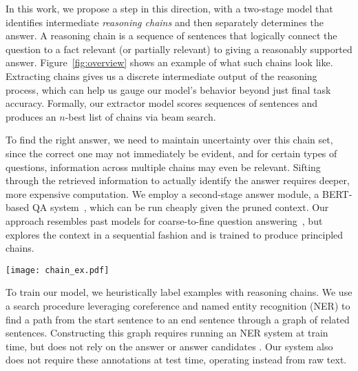 \documentclass[11pt,a4paper]{article}
\begin{document}
In this work, we propose a step in this direction, with a two-stage model that identifies intermediate \emph{reasoning chains} and then separately determines the answer. A reasoning chain is a sequence of sentences that logically connect the question to a fact relevant (or partially relevant) to giving a reasonably supported answer. Figure~\ref{fig:overview} shows an example of what such chains look like. Extracting chains gives us a discrete intermediate output of the reasoning process, which can help us gauge our model's behavior beyond just final task accuracy. Formally, our extractor model scores sequences of sentences and produces an $n$-best list of chains via beam search.

To find the right answer, we need to maintain uncertainty over this chain set, since the correct one may not immediately be evident, and for certain types of questions, information across multiple chains may even be relevant. Sifting through the retrieved information to actually identify the answer requires deeper, more expensive computation. We employ a second-stage answer module, a BERT-based QA system~\citep{devlin2018bert}, which can be run cheaply given the pruned context. Our approach resembles past models for coarse-to-fine question answering~\citep{choi2017coarse, min2018efficient, wang2019evidence}, but explores the context in a sequential fashion and is trained to produce principled chains.



\begin{figure*}[t]
\centering
\texttt{[image: chain\_ex.pdf]}
\caption{A multi-hop example chosen from the HotpotQA development set. Several documents are given as context to answer a question. We show two possible ``reasoning chains'' that leverage connections (shared entities or coreference relations) between sentences to arrive at the answer. The first chain is most appropriate, while the second requires a less well-supported inferential leap.}
\vspace{-0.5cm}
    \label{fig:overview}
\end{figure*}

To train our model, we heuristically label examples with reasoning chains. We use a search procedure leveraging coreference and named entity recognition (NER) to find a path from the start sentence to an end sentence through a graph of related sentences. Constructing this graph requires running an NER system at train time, but does not rely on the answer or answer candidates \citep{kundu2018exploiting}. Our system also does not require these annotations at test time, operating instead from raw text.
\end{document}
